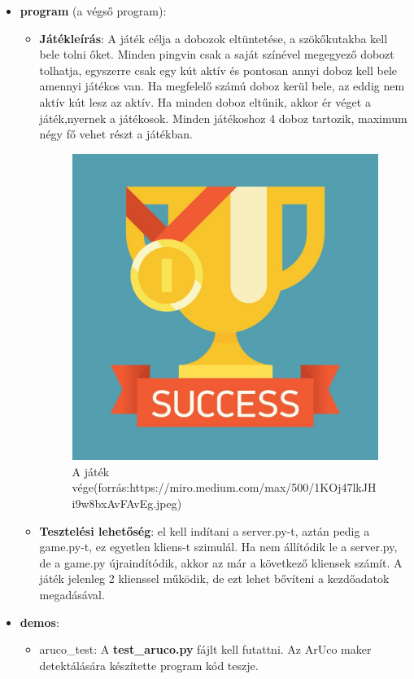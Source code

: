 \begin{itemize}
\item \textbf{program} (a végső program): 
\begin{itemize}
\item \textbf{Játékleírás}: A játék célja a dobozok eltüntetése, a szökőkutakba kell bele tolni őket.
Minden pingvin csak a saját színével megegyező dobozt tolhatja, egyszerre csak egy kút aktív és
pontosan annyi doboz kell bele amennyi játékos van. Ha megfelelő számú doboz kerül bele, az eddig nem aktív kút lesz az aktív.
Ha minden doboz eltűnik, akkor ér véget a játék,nyernek a játékosok.  
Minden játékoshoz 4 doboz tartozik, maximum négy fő vehet részt a játékban.
\begin{figure}[htp]
    \centering
   	\includegraphics[scale=0.1]{images/win.jpg}
	\caption{A játék vége(forrás:https://miro.medium.com/max/500/1\*KOj47lkJHi9w8bxAvFAvEg.jpeg)}
	\label{fig:win}
\end{figure}
\item \textbf{Tesztelési lehetőség}: el kell indítani a server.py-t, aztán pedig a game.py-t, ez egyetlen kliens-t szimulál.
Ha nem állítódik le a server.py, de a game.py újraindítódik, akkor az már a következő kliensek számít.
A játék jelenleg 2 klienssel működik, de ezt lehet bővíteni a kezdőadatok megadásával.
\end{itemize}
\item \textbf{demos}:
\begin{itemize}
\item aruco\_test:
A \textbf{test\_aruco.py} fájlt kell futattni.
Az ArUco maker detektálására készítette program kód teszje. 


\end{itemize}
\end{itemize}
